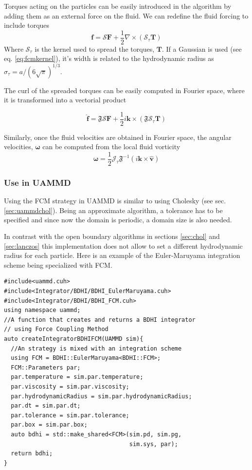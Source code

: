 \documentclass[ twoside,openright,titlepage,numbers=noenddot,%
headinclude,footinclude,cleardoublepage=empty,abstract=on,
BCOR=5mm,paper=a4,fontsize=11pt, dvipsnames
]{scrreprt}
\def\ucpp{uammd_cpp_lexer.py:UAMMDCppLexer -x}
\renewcommand{\vec}[1]{\bm{#1}}
\newcommand{\oper}[1]{\mathcal{#1}}
\newcommand{\uammd}{\gls{UAMMD}\xspace}
\newcommand{\half}{\frac{1}{2}}
\newcommand{\fou}[1]{\widehat{#1}}
\newcommand{\fvel}{v}
\begin{document}
Torques acting on the particles can be easily introduced in the algorithm by adding them as an external force on the fluid. We can redefine the fluid forcing to include torques
\begin{equation}
\vec{f} = \oper{S}\vec{F} + \half\nabla\times(\oper{S}_\tau\vec{T})
\end{equation}
Where $\oper{S}_\tau$ is the kernel used to spread the torques, $\vec{T}$. If a Gaussian is used (see eq. \eqref{eq:fcmkernel}), it's width is related to the hydrodynamic radius as $\sigma_\tau = a/(6\sqrt{\pi})^{1/3}$.

The curl of the spreaded torques can be easily computed in Fourier space, where it is transformed into a vectorial product

\begin{equation}
\fou{\vec{f}} = \mathfrak{F}\oper{S}\vec{F} + \half i\vec{k}\times(\mathfrak{F}\oper{S}_\tau\vec{T})
\end{equation}

Similarly, once the fluid velocities are obtained in Fourier space, the angular velocities, $\vec{\omega}$ can be computed from the local fluid vorticity
\begin{equation}
  \vec{\omega} = \half\oper{J}_\tau\mathfrak{F}^{-1}\left(i\vec{k}\times\fou{\vec{\fvel}}\right)
\end{equation}


\subsubsection*{Use in UAMMD}
Using the \gls{FCM} strategy in \uammd is similar to using Cholesky (see sec. \ref{sec:uammdchol}). Being an approximate algorithm, a tolerance has to be specified and since now the domain is periodic, a domain size is also needed.

In contrast with the open boundary algorithms in sections \ref{sec:chol} and \ref{sec:lanczos} this implementation does not allow to set a different hydrodynamic radius for each particle.
Here is an example of the Euler-Maruyama integration scheme being specialized with \gls{FCM}.
\begin{verbatim}
#include<uammd.cuh>
#include<Integrator/BDHI/BDHI_EulerMaruyama.cuh>
#include<Integrator/BDHI/BDHI_FCM.cuh>
using namespace uammd;
//A function that creates and returns a BDHI integrator
// using Force Coupling Method
auto createIntegratorBDHIFCM(UAMMD sim){   
  //An strategy is mixed with an integration scheme
  using FCM = BDHI::EulerMaruyama<BDHI::FCM>;
  FCM::Parameters par;
  par.temperature = sim.par.temperature;
  par.viscosity = sim.par.viscosity;
  par.hydrodynamicRadius = sim.par.hydrodynamicRadius;
  par.dt = sim.par.dt;
  par.tolerance = sim.par.tolerance;
  par.box = sim.par.box;
  auto bdhi = std::make_shared<FCM>(sim.pd, sim.pg, 
                                    sim.sys, par);
  return bdhi;
}
\end{verbatim}
\end{document}
